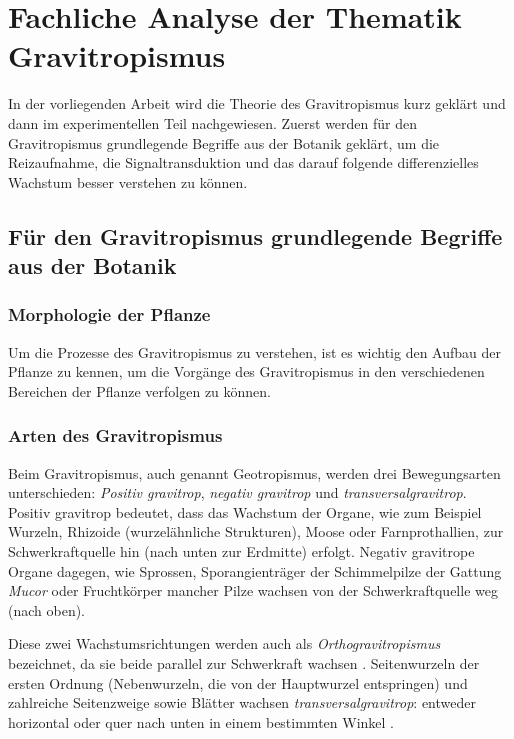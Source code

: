 \documentclass[
a4paper, 
11pt, 
ngerman,
listof=totoc,
bibliography=totocnumbered,
abstracton
]{scrreprt}
\begin{document}



\chapter{Fachliche Analyse der Thematik Gravitropismus}

In der vorliegenden Arbeit wird die Theorie des Gravitropismus kurz geklärt und dann im experimentellen Teil nachgewiesen. Zuerst werden für den Gravitropismus grundlegende Begriffe aus der Botanik geklärt, um die Reizaufnahme, die Signaltransduktion und das darauf folgende differenzielles Wachstum besser verstehen zu können.  



\section{Für den Gravitropismus grundlegende Begriffe aus der Botanik}

\subsection{Morphologie der Pflanze}

Um die Prozesse des Gravitropismus zu verstehen, ist es wichtig den Aufbau der Pflanze zu kennen, um die Vorgänge des Gravitropismus in den verschiedenen Bereichen der Pflanze verfolgen zu können.




\subsection{Arten des Gravitropismus}

Beim Gravitropismus, auch genannt Geotropismus, werden drei Bewegungsarten unterschieden: \emph{Positiv gravitrop},  \emph{negativ gravitrop} und  \emph{transversalgravitrop}.
Positiv gravitrop bedeutet, dass das Wachstum der Organe, wie zum Beispiel Wurzeln, Rhizoide (wurzelähnliche Strukturen), Moose oder Farnprothallien, zur Schwerkraftquelle hin (nach unten zur Erdmitte) erfolgt.
Negativ gravitrope Organe dagegen, wie Sprossen, Sporangienträger der Schimmelpilze der Gattung \emph{Mucor} oder Fruchtkörper mancher Pilze wachsen von der Schwerkraftquelle weg (nach oben).

Diese zwei Wachstumsrichtungen werden auch als \emph{Orthogravitropismus} bezeichnet, da sie beide parallel zur Schwerkraft wachsen \parencite[546]{Jacob}.
Seitenwurzeln der ersten Ordnung (Nebenwurzeln, die von der Hauptwurzel entspringen) und zahlreiche Seitenzweige sowie Blätter wachsen \emph{ transversalgravitrop}: entweder horizontal oder quer nach unten in einem bestimmten Winkel \parencite[449]{Strasburger}. 
\end{document}
